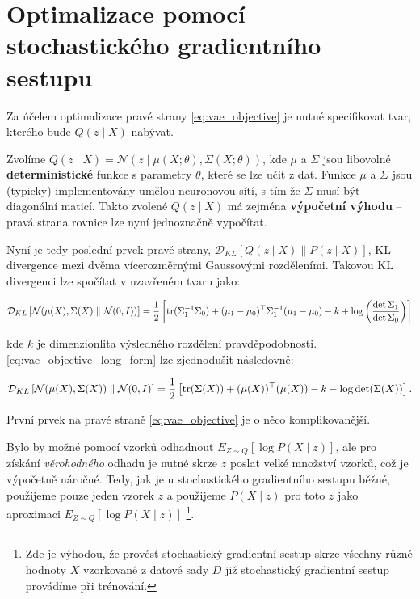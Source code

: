 \section{Optimalizace pomocí stochastického gradientního sestupu}

Za účelem optimalizace pravé strany \autoref{eq:vae_objective} je nutné specifikovat tvar, kterého bude $Q(z\mid X)$ nabývat.

Zvolíme $Q(z\mid X) = \mathcal{N}(z\mid \mu(X;\theta),\Sigma(X;\theta))$, kde $\mu$ a $\Sigma$ jsou libovolné \textbf{deterministické} funkce s parametry $\theta$, které se lze učit z dat.
Funkce $\mu$ a $\Sigma$ jsou (typicky) implementovány umělou neuronovou sítí, s tím že $\Sigma$ musí být diagonální maticí.
Takto zvolené $Q(z\mid X)$ má zejména \textbf{výpočetní výhodu} – pravá strana rovnice lze nyní jednoznačně vypočítat.

Nyní je tedy poslední prvek pravé strany, $\mathcal{D}_{KL}\left[ Q(z \mid X)\parallel P(z\mid X) \right]$, KL divergence mezi dvěma vícerozměrnými Gaussovými rozděleními.
Takovou KL divergenci lze spočítat v uzavřeném tvaru jako:

\begin{equation}\label{eq:vae_objective_long_form}
    \mathcal{D}_{KL} \left[ \mathcal{N}(\mu(X), \Sigma(X)\parallel \mathcal{N}(0, I)) \right] = 
    \frac{1}{2}\left[ \operatorname{\text{tr}} (\Sigma_1^{-1}\Sigma_0) + (\mu_1 - \mu_0)^\top \Sigma_1^{-1}(\mu_1 - \mu_0) - k + \log \left(\frac{\det \Sigma_1}{\det \Sigma_0} \right) \right]
\end{equation}

kde $k$ je dimenzionlita výsledného rozdělení pravděpodobnosti. \autoref{eq:vae_objective_long_form} lze zjednodušit následovně:

\begin{equation}
    \mathcal{D}_{KL} \left[ \mathcal{N}(\mu(X), \Sigma(X)) \parallel \mathcal{N}(0, I) \right] = 
    \frac{1}{2} \left[ \operatorname{\text{tr}} (\Sigma(X)) + (\mu(X))^\top (\mu(X)) - k - \log \det (\Sigma(X)) \right].
\end{equation}

První prvek na pravé straně \autoref{eq:vae_objective} je o něco komplikovanější.

Bylo by možné pomocí vzorků odhadnout $E_{Z\sim Q}[\log P(X\mid z)]$, ale pro získání \emph{věrohodného} odhadu je nutné skrze $z$ poslat velké množství vzorků, což je výpočetně náročné.
Tedy, jak je u stochastického gradientního sestupu běžné, použijeme pouze jeden vzorek $z$ a použijeme $P(X\mid z)$ pro toto $z$ jako aproximaci $E_{Z\sim Q}[\log P(X\mid z)]$
\footnote{Zde je výhodou, že provést stochastický gradientní sestup skrze všechny různé hodnoty $X$ vzorkované z datové sady $D$ již stochastický gradientní sestup provádíme při trénování.}.

